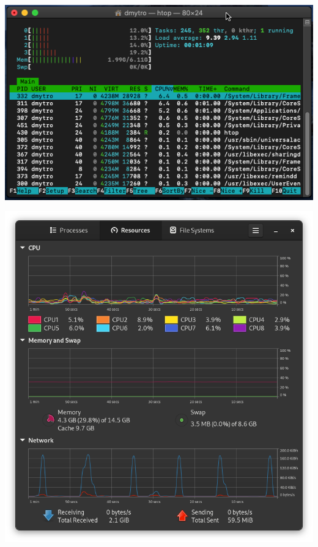 \documentclass{article}
\begin{document}
\begin{normalsize}
\begin{center}
	\end{center}
	\begin{center}
		\includegraphics[scale=0.5]{htop2}
	\end{center}
	\begin{center}
		\includegraphics[scale=0.5]{sm1}
	\end{center}
	\begin{center}

\end{center}
\end{normalsize}
\end{document}
